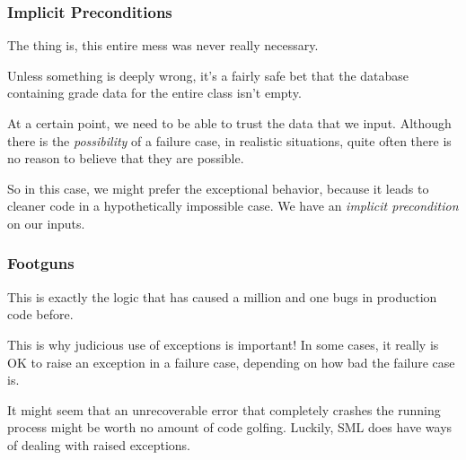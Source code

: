 \documentclass[aspectratio=169]{beamer}
\begin{document}
\begin{frame}[fragile]
  \frametitle{Implicit Preconditions}

  The thing is, this entire mess was never really necessary. 

  \pause
  \vspace{\fill}

  Unless something is deeply wrong, it's a fairly safe bet that
  the database containing grade data for the entire class  
  isn't empty.\footnotemark

  \pause
  \vspace{\fill}

  At a certain point, we need to be able to trust the data that we input.
  Although there is the \textit{possibility} of a failure case, in realistic
  situations, quite often there is no reason to believe that they are possible.

  \pause
  \vspace{\fill}

  So in this case, we might prefer the exceptional behavior, because it leads
  to cleaner code in a hypothetically impossible case. We have an 
  \textit{implicit precondition} on our inputs.

\end{frame}

\begin{frame}[fragile]
  \frametitle{Footguns}

  This is exactly the logic that has caused a million and one bugs in production
  code before.

  \pause
  \vspace{\fill}

  This is why judicious use of exceptions is important! In some cases, it really
  is OK to raise an exception in a failure case, depending on how bad the 
  failure case is.

  \pause
  \vspace{\fill}

  It might seem that an unrecoverable error that completely crashes the 
  running process might be worth no amount of code golfing. Luckily,
  SML does have ways of dealing with raised exceptions. 
\end{frame}

\end{document}
